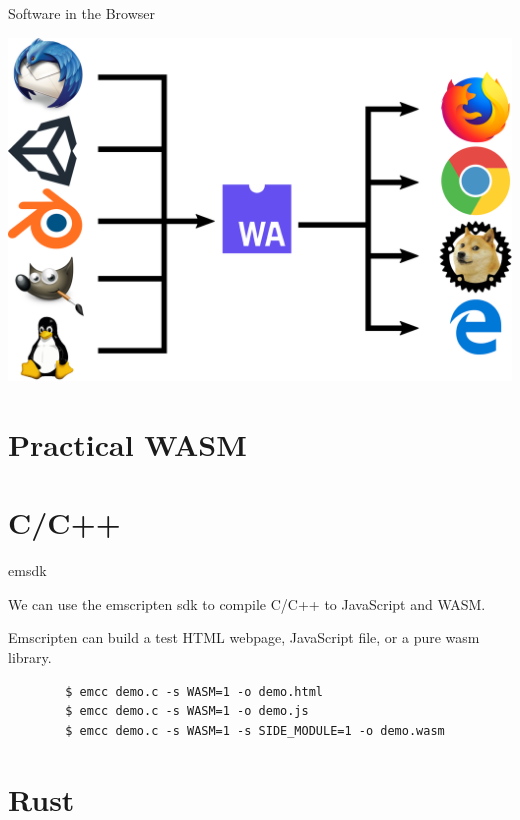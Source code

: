 \documentclass{lug}
\newcommand{\pmidg}[1]{\parbox{\widthof{#1}}{#1}}
\begin{document}
\begin{frame}{Software in the Browser}
    \pmidg{\includegraphics[width=\columnwidth]{graphics/wasm_chain}}
\end{frame}

\renewcommand{\secimage}{graphics/js_disabled}
\section{Practical WASM}

\renewcommand{\secimage}{graphics/c_logo}
\section{C/C++}

\begin{frame}[fragile]{emsdk}

    We can use the emscripten sdk to compile C/C++ to JavaScript and WASM.

    \vspace{2ex}

    Emscripten can build a test HTML webpage, JavaScript file, or a pure wasm
    library.

    \begin{verbatim}
        $ emcc demo.c -s WASM=1 -o demo.html
        $ emcc demo.c -s WASM=1 -o demo.js
        $ emcc demo.c -s WASM=1 -s SIDE_MODULE=1 -o demo.wasm 
    \end{verbatim}

\end{frame}

\renewcommand{\secimage}{graphics/rust_logo}
\section{Rust}
\end{document}
